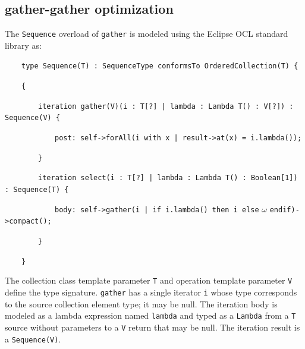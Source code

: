 \documentclass[
]{ceurart}
\begin{document}
\subsection{gather-gather optimization}\label{gather-gather optimization}

The \verb!Sequence! overload of \verb!gather! is modeled using the Eclipse OCL standard library as:

\begin{description}[itemsep=-0.2cm]\small\begin{samepage}
\item ~~~~\verb!type Sequence(T) : SequenceType conformsTo OrderedCollection(T) {!
\item ~~~~\verb!{!
\item ~~~~~~~~\verb!iteration gather(V)(i : T[?] | lambda : Lambda T() : V[?]) : Sequence(V) {!
\item ~~~~~~~~~~~~\verb!post: self->forAll(i with x | result->at(x) = i.lambda());!
\item ~~~~~~~~\verb!}!
\item ~~~~~~~~\verb!iteration select(i : T[?] | lambda : Lambda T() : Boolean[1]) : Sequence(T) {!
\item ~~~~~~~~~~~~\verb!body: self->gather(i | if i.lambda() then i else! $\omega$ \verb!endif)->compact();!
\item ~~~~~~~~\verb!}!
\item ~~~~\verb!}!
\end{samepage}\end{description}

The collection class template parameter \verb!T! and operation template parameter \verb!V! define the type signature. \verb!gather! has a single iterator \verb!i! whose type corresponds to the source collection element type; it may be null. The iteration body is modeled as a lambda expression named \verb!lambda! and typed as a \verb!Lambda! from a \verb!T! source without parameters to a \verb!V! return that may be null. The iteration result is a \verb!Sequence(V)!.

\end{document}
